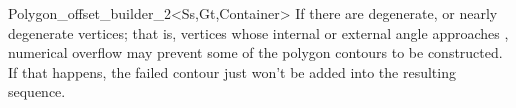 \begin{ccRefClass}{Polygon_offset_builder_2<Ss,Gt,Container>}
{If there are degenerate, or nearly degenerate vertices; that is, vertices whose internal or external angle approaches , numerical overflow may prevent some of the polygon contours to be constructed. If that happens, the failed contour just won't be added into the resulting sequence.
}
  

\ccSeeAlso
{}\\
\\
\\
\end{ccRefClass}

